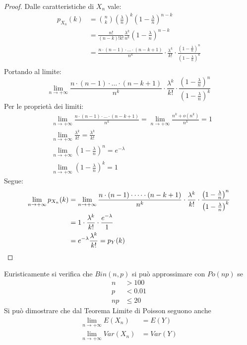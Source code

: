 \documentclass{article}
\theoremstyle{plain}
\theoremstyle{definition}
\theoremstyle{remark}
\begin{document}
\begin{proof}
	Dalle caratteristiche di $X_n$ vale:
	\begin{align*}
		p_X_n(k)&=\binom{n}{k}\left(\frac{\lambda}{n}\right)^k\left(1-\frac{\lambda}{n}\right)^{n-k}\\
		&=\frac{n!}{(n-k)!k!}\frac{\lambda^k}{n^k}\left(1-\frac{\lambda}{n}\right)^{n-k}\\
		&=\frac{n\cdot(n-1)\cdot\dots\cdot(n-k+1)}{n^k}\cdot\frac{\lambda^k}{k!}\cdot\frac{\left(1-\frac{\lambda}{n}\right)^n}{\left(1-\frac{\lambda}{n}\right)^k}\\
	\end{align*}
	Portando al limite:
	\begin{equation*}
		\lim_{n\to+\infty}\frac{n\cdot(n-1)\cdot\dots\cdot(n-k+1)}{n^k}\cdot\frac{\lambda^k}{k!}\cdot\frac{\left(1-\frac{\lambda}{n}\right)^n}{\left(1-\frac{\lambda}{n}\right)^k}
	\end{equation*}
	Per le proprietà dei limiti:
	\begin{align*}
		&\lim_{n\to+\infty}\frac{n\cdot(n-1)\cdot\dots\cdot(n-k+1)}{n^k}=\lim_{n\to+\infty}\frac{n^k+o(n^k)}{n^k}=1\\
		&\lim_{n\to+\infty}\frac{\lambda^k}{k!}=\frac{\lambda^k}{k!}\\
		&\lim_{n\to+\infty}\left(1-\frac{\lambda}{n}\right)^n=e^{-\lambda}\\
		&\lim_{n\to+\infty}\left(1-\frac{\lambda}{n}\right)^k=1
	\end{align*}
	Segue:
	\begin{align*}
		\lim_{n\to+\infty}p_{X_n}(k)&=\lim_{n\to+\infty}\frac{n\cdot(n-1)\cdot\dots\cdot(n-k+1)}{n^k}\cdot\frac{\lambda^k}{k!}\cdot\frac{\left(1-\frac{\lambda}{n}\right)^n}{\left(1-\frac{\lambda}{n}\right)^k}\\
		&=1\cdot\frac{\lambda^k}{k!}\cdot \frac{e^{-\lambda}}{1}\\
		&=e^{-\lambda}\frac{\lambda^k}{k!}=p_Y(k)\qedhere
	\end{align*}
\end{proof}
Euristicamente si verifica che $Bin(n,p)$ si può approssimare con $Po(np)$ se
\begin{align*}
	n&>100\\
	p&<0.01\\
	np&\leq20
\end{align*}
Si può dimostrare che dal Teorema Limite di Poisson seguono anche
\begin{align*}
	\lim_{n\to+\infty}E(X_n)&=E(Y)\\
	\lim_{n\to+\infty}Var(X_n)&=Var(Y)\\
\end{align*}
\end{document}
